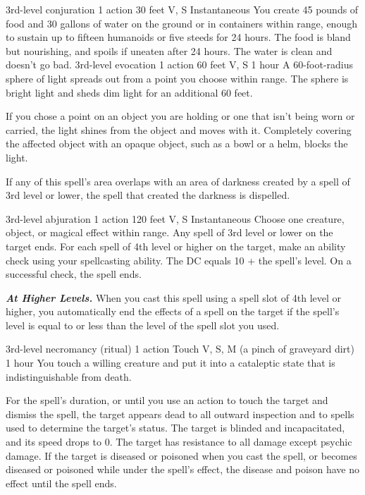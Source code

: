 \documentclass[10pt,twoside,twocolumn,openany]{book}
\newcommand\impact[1]{
	\textbf{\textit{#1}}
}
\begin{document}
{3rd-level conjuration}
{\color{action}1 action}
{30 feet}
{V, S}
{Instantaneous}
You create 45 pounds of food and 30 gallons of water on the ground or in containers within range, enough to sustain up to fifteen humanoids or five steeds for 24 hours. The food is bland but nourishing, and spoils if uneaten after 24 hours. The water is clean and doesn't go bad.
\newpage
{}
{3rd-level evocation}
{\color{action}1 action}
{60 feet}
{V, S}
{1 hour}
A 60-foot-radius sphere of light spreads out from a point you choose within range. The sphere is bright light and sheds dim light for an additional 60 feet.

If you chose a point on an object you are holding or one that isn't being worn or carried, the light shines from the object and moves with it. Completely covering the affected object with an opaque object, such as a bowl or a helm, blocks the light.

If any of this spell's area overlaps with an area of darkness created by a spell of 3rd level or lower, the spell that created the darkness is dispelled.

{3rd-level abjuration}
{\color{action}1 action}
{120 feet}
{V, S}
{Instantaneous}
Choose one creature, object, or magical effect within range. Any spell of 3rd level or lower on the target ends. For each spell of 4th level or higher on the target, make an ability check using your spellcasting ability. The DC equals 10 + the spell's level. On a successful check, the spell ends.

\impact{At Higher Levels.} When you cast this spell using a spell slot of 4th level or higher, you automatically end the effects of a spell on the target if the spell's level is equal to or less than the level of the spell slot you used.

{3rd-level necromancy {\color{ritual}(ritual)}}
{\color{action}1 action}
{Touch}
{V, S, M (a pinch of graveyard dirt)}
{1 hour}
You touch a willing creature and put it into a cataleptic state that is indistinguishable from death.

For the spell's duration, or until you use an action to touch the target and dismiss the spell, the target appears dead to all outward inspection and to spells used to determine the target's status. The target is blinded and incapacitated, and its speed drops to 0. The target has resistance to all damage except psychic damage. If the target is diseased or poisoned when you cast the spell, or becomes diseased or poisoned while under the spell's effect, the disease and poison have no effect until the spell ends.
\end{document}

